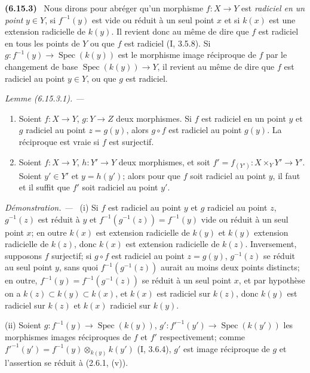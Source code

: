 \documentclass[10pt,oneside]{book}
\newcommand{\oldpage}[2][]{%
  \setcounter{footnote}{0}%
  \marginpar{\scriptsize\textbf{#1}~|~#2}\ignorespaces}
\newenvironment{env}[1][]{\par\medskip\noindent\textbf{(#1)}\ }{\par}
\newenvironment{lemma}[1][]{%
  \par\medskip\noindent\itshape Lemme (#1). ---\ }{\par}
\newenvironment{proof}{%
  \par\medskip\noindent\textit{Démonstration. ---\ }}{\par}
\begin{document}
\begin{env}[6.15.3]
\label{IV.2.s6.15.3-fr}
Nous dirons pour abréger qu'un morphisme $f:X\to Y$ est \emph{radiciel en
un point} $y\in Y$, si $f^{-1}(y)$ est vide ou réduit à un seul point $x$
et si $k(x)$ est une extension radicielle de $k(y)$. Il revient donc au
même de dire que $f$ est radiciel en tous les points de $Y$ ou que $f$ est
radiciel (I, 3.5.8). Si
$g:f^{-1}(y)\to\operatorname{Spec}(k(y))$ est le morphisme image réciproque
de $f$ par le changement de base
$\operatorname{Spec}(k(y))\to Y$, il revient au même de dire que $f$ est
radiciel au point $y\in Y$, ou que $g$ est radiciel.
\end{env}

\begin{lemma}[6.15.3.1]
\label{IV.2.s6.15.3.1-fr}
\begin{enumerate}
\item[(i)] Soient $f:X\to Y$, $g:Y\to Z$ deux morphismes. Si $f$ est
radiciel en un point $y$ et $g$ radiciel au point $z=g(y)$, alors $g\circ f$
est radiciel au point $g(y)$. La réciproque est vraie si $f$ est surjectif.
\item[(ii)] Soient $f:X\to Y$, $h:Y'\to Y$ deux morphismes, et soit
$f'=f_{(Y')}:X\times_Y Y'\to Y'$. Soient $y'\in Y'$ et $y=h(y')$; alors
pour que $f$ soit radiciel au point $y$, il faut et il suffit que $f'$ soit
radiciel au point $y'$.
\end{enumerate}
\end{lemma}

\begin{proof}
\oldpage[IV-2]{178}
(i) Si $f$ est radiciel au point $y$ et $g$ radiciel au point $z$,
$g^{-1}(z)$ est réduit à $y$ et
$f^{-1}(g^{-1}(z))=f^{-1}(y)$ vide ou réduit à un seul point $x$; en
outre $k(x)$ est extension radicielle de $k(y)$ et $k(y)$ extension
radicielle de $k(z)$, donc $k(x)$ est extension radicielle de $k(z)$.
Inversement, supposons $f$ surjectif; si $g\circ f$ est radiciel au point
$z=g(y)$, $g^{-1}(z)$ se réduit au seul point $y$, sans quoi
$f^{-1}(g^{-1}(z))$ aurait au moins deux points distincts; en outre,
$f^{-1}(y)=f^{-1}(g^{-1}(z))$ se réduit à un seul point $x$, et par
hypothèse on a $k(z)\subset k(y)\subset k(x)$, et $k(x)$ est radiciel sur
$k(z)$, donc $k(y)$ est radiciel sur $k(z)$ et $k(x)$ radiciel sur $k(y)$.

(ii) Soient $g:f^{-1}(y)\to\operatorname{Spec}(k(y))$,
$g':f'^{-1}(y')\to\operatorname{Spec}(k(y'))$ les morphismes images
réciproques de $f$ et $f'$ respectivement; comme
$f'^{-1}(y')=f^{-1}(y)\otimes_{k(y)}k(y')$ (I, 3.6.4), $g'$ est image
réciproque de $g$ et l'assertion se réduit à (2.6.1, (v)).
\end{proof}
\end{document}
